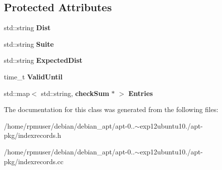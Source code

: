 \subsection*{\-Protected \-Attributes}
\begin{DoxyCompactItemize}
\item 
std\-::string {\bfseries \-Dist}\label{classindexRecords_a33081b77174947a0be46935e0defd3c5}

\item 
std\-::string {\bfseries \-Suite}\label{classindexRecords_a283df0e74e9dc749a4270bca1f132f27}

\item 
std\-::string {\bfseries \-Expected\-Dist}\label{classindexRecords_a2f188246ad92053727c4e6e6e215ef17}

\item 
time\-\_\-t {\bfseries \-Valid\-Until}\label{classindexRecords_aa699673f2c2f7bc7a02eb5784bd14efd}

\item 
std\-::map$<$ std\-::string, {\bf check\-Sum} $\ast$ $>$ {\bfseries \-Entries}\label{classindexRecords_ac95ce47c30383ce5d50ed834b9e198f7}

\end{DoxyCompactItemize}


\-The documentation for this class was generated from the following files\-:\begin{DoxyCompactItemize}
\item 
/home/rpmuser/debian/debian\-\_\-apt/apt-\/0..$\sim$exp12ubuntu10./apt-\/pkg/indexrecords.\-h\item 
/home/rpmuser/debian/debian\-\_\-apt/apt-\/0..$\sim$exp12ubuntu10./apt-\/pkg/indexrecords.\-cc\end{DoxyCompactItemize}
